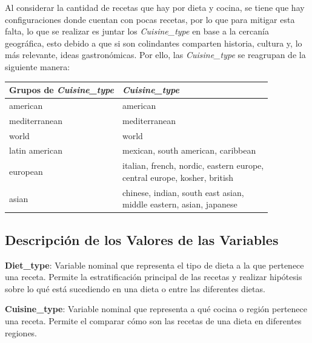 \documentclass[12pt,a4paper]{article}
\begin{document}
{{            Al considerar la cantidad de recetas que hay por dieta y cocina, se tiene que 
            hay configuraciones donde cuentan con pocas recetas, 
            por lo que para mitigar esta falta, lo que se realizar es juntar 
            los \emph{Cuisine\_type} en base a la cercanía geográfica, esto debido a 
            que si son colindantes comparten historia, cultura y, lo más relevante, ideas 
            gastronómicas. Por ello, las \emph{Cuisine\_type} se reagrupan de la siguiente 
            manera: 

            \begin{center}
                \begin{tabular}{l|l}
                \toprule
                    Grupos de \emph{Cuisine\_type} & \emph{Cuisine\_type} \\
                \midrule
                    american & american \\
                    mediterranean & mediterranean \\
                    world & world \\
                    latin american & mexican, south american, caribbean \\
                    european & \makecell{italian, french, nordic, eastern europe,\\central europe, kosher, british} \\
                    asian & \makecell{chinese, indian, south east asian,\\middle eastern, asian, japanese} \\
                \bottomrule
                \end{tabular}
            \end{center}
        }

        \subsection{Descripción de los Valores de las Variables}
        {
            \begin{itemize}[label=\textbullet]
            {
                \item \textbf{Diet\_type}: Variable nominal que representa el tipo de 
                dieta a la que pertenece una receta. Permite la estratificación principal de  
                las recetas y realizar hipótesis sobre lo qué está sucediendo en una dieta o entre las diferentes dietas.
                
                \item \textbf{Cuisine\_type}: Variable nominal que representa a qué 
                cocina o región pertenece una 
                receta. Permite el comparar cómo son las recetas 
                de una dieta en diferentes regiones.
                
}
\end{itemize}}}
\end{document}
